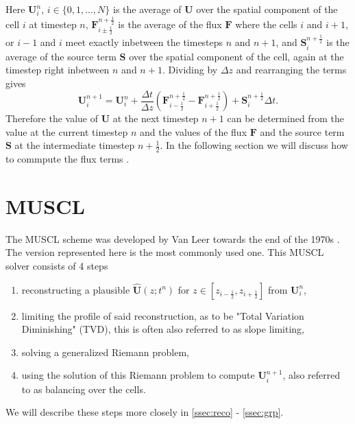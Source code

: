 \documentclass[a4paper, oneside]{discothesis}
\begin{document}
Here $\mathbf{U}_i^n$, $i \in \{0,1,...,N\}$ is the average of $\mathbf{U}$ over the spatial component of the cell $i$ at timestep $n$,
$\mathbf{F}_{i \pm \frac{1}{2}}^{n + \frac{1}{2}}$ is the average of the flux $\mathbf{F}$ where the cells $i$ and $i+1$, or  $i-1$ and $i$  meet exactly inbetween the timesteps $n$ and $n + 1$, and $\mathbf{S}_i^{n+\frac{1}{2}}$ is the average of the source term $\mathbf{S}$ over the spatial component of the cell, again at the timestep right inbetween $n$ and $n+1$.
Dividing by $\Delta z$ and rearranging the terms gives
\begin{equation}
	\mathbf{U} _i^{n+1} = \mathbf{U}_i^n + \frac{\Delta t}{\Delta z} (\mathbf{F}_{i-\frac{1}{2}}^{n+\frac{1}{2}} - \mathbf{F}_{i+\frac{1}{2}}^{n+\frac{1}{2}}) + \mathbf{S}_i^{n+\frac{1}{2}} \Delta t. \label{eq:fv}
\end{equation}
Therefore the value of $\mathbf{U}$ at the next timestep $n+1$ can be determined from the value at the current timestep $n$ and the values of the flux $\mathbf{F}$ and the source term $\mathbf{S}$ at the intermediate timestep $n + \frac{1}{2}$.
In the following section we will discuss how to commpute the flux terms \cite{guinot2012wave}.

\section{MUSCL} \label{sec:muscl}
The MUSCL scheme was developed by Van Leer towards the end of the 1970s \cite{van1977towards} \cite{van1979towards}.
The version represented here is the most commonly used one.
This MUSCL solver consists of 4 steps
\begin{enumerate}
	\item reconstructing a plausible $\mathbf{\hat{U}}(z;t^n)$ for $z \in [z_{i-\frac{1}{2}}, z_{i+\frac{1}{2}}]$ from $\mathbf{U}_i^n$,
	\item limiting the profile of said reconstruction, as to be "Total Variation Diminishing" (TVD), this is often also referred to as slope limiting,
	\item solving a generalized Riemann problem,
	\item using the solution of this Riemann problem to compute $\mathbf{U}_i^{n+1}$, also referred to as balancing over the cells.
\end{enumerate}
We will describe these steps more closely in \autoref{ssec:reco} - \autoref{ssec:grp}.
\end{document}
